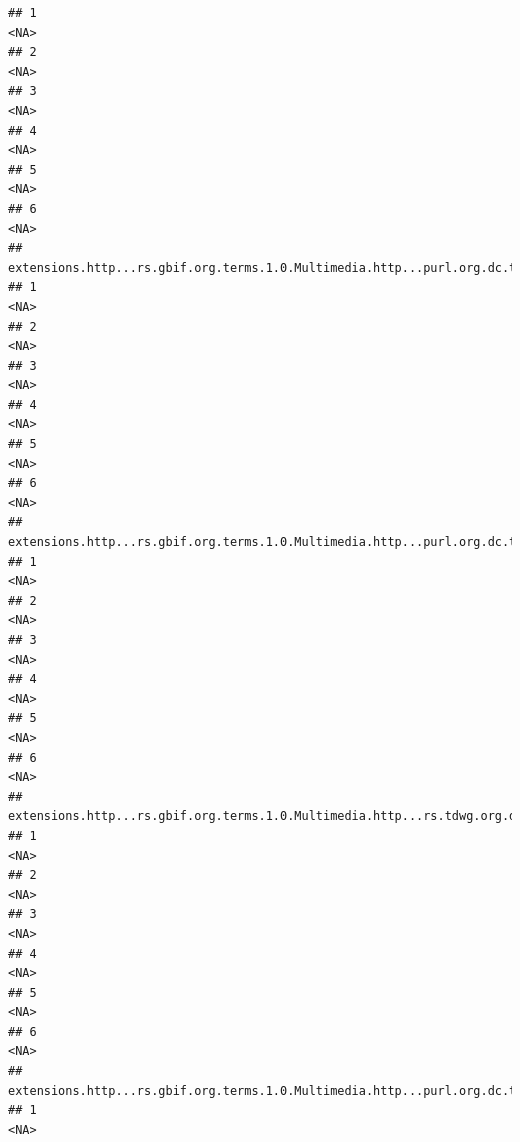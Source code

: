 \documentclass[
]{book}
\begin{document}
\begin{verbatim}
## 1                                                                                     <NA>
## 2                                                                                     <NA>
## 3                                                                                     <NA>
## 4                                                                                     <NA>
## 5                                                                                     <NA>
## 6                                                                                     <NA>
##   extensions.http...rs.gbif.org.terms.1.0.Multimedia.http...purl.org.dc.terms.identifier
## 1                                                                                   <NA>
## 2                                                                                   <NA>
## 3                                                                                   <NA>
## 4                                                                                   <NA>
## 5                                                                                   <NA>
## 6                                                                                   <NA>
##   extensions.http...rs.gbif.org.terms.1.0.Multimedia.http...purl.org.dc.terms.type
## 1                                                                             <NA>
## 2                                                                             <NA>
## 3                                                                             <NA>
## 4                                                                             <NA>
## 5                                                                             <NA>
## 6                                                                             <NA>
##   extensions.http...rs.gbif.org.terms.1.0.Multimedia.http...rs.tdwg.org.dwc.terms.catalogNumber
## 1                                                                                          <NA>
## 2                                                                                          <NA>
## 3                                                                                          <NA>
## 4                                                                                          <NA>
## 5                                                                                          <NA>
## 6                                                                                          <NA>
##   extensions.http...rs.gbif.org.terms.1.0.Multimedia.http...purl.org.dc.terms.publisher
## 1                                                                                  <NA>

\end{verbatim}
\end{document}

